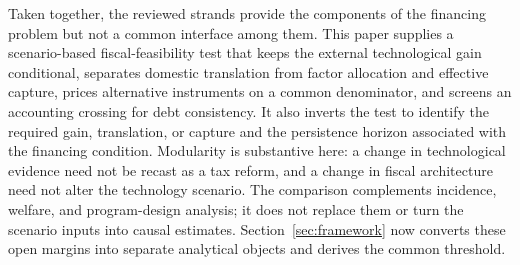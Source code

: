 Taken together, the reviewed strands provide the components of the financing problem but not a common interface among them. This paper supplies a scenario-based fiscal-feasibility test that keeps the external technological gain conditional, separates domestic translation from factor allocation and effective capture, prices alternative instruments on a common denominator, and screens an accounting crossing for debt consistency. It also inverts the test to identify the required gain, translation, or capture and the persistence horizon associated with the financing condition. Modularity is substantive here: a change in technological evidence need not be recast as a tax reform, and a change in fiscal architecture need not alter the technology scenario. The comparison complements incidence, welfare, and program-design analysis; it does not replace them or turn the scenario inputs into causal estimates. Section~\ref{sec:framework} now converts these open margins into separate analytical objects and derives the common threshold.
